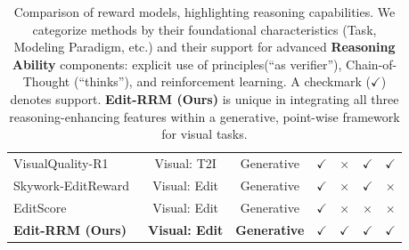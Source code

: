 \begin{table}[t]
{\begin{tabular}{l|c|c|c|ccc}
VisualQuality-R1~\citep{wu2025visualquality}         & Visual: T2I          &  Generative  & $\checkmark$ & $\times$     & $\checkmark$  & $\checkmark$     \\
Skywork-EditReward~\citep{wei2025skywork}      & Visual: Edit            &  Generative  & $\checkmark$ & $\times$     & $\checkmark$  & $\times$     \\
EditScore~\citep{luo2025editscore}         & Visual: Edit     & Generative  &$\checkmark$     & $\times$     & $\times$  & $\times$     \\
\textbf{Edit-RRM (Ours)}                      & \textbf{Visual: Edit   } &  \textbf{Generative} & $\checkmark$ & $\checkmark$ & $\checkmark$  & $\checkmark$    \\
\bottomrule
\end{tabular}%
}
\caption{Comparison of reward models, highlighting reasoning capabilities. We categorize methods by their foundational characteristics (Task, Modeling Paradigm, etc.) and their support for advanced \textbf{Reasoning Ability} components: explicit use of principles(``as verifier''), Chain-of-Thought (``thinks''), and reinforcement learning. A checkmark ($\checkmark$) denotes support. \textbf{Edit-RRM (Ours)} is unique in integrating all three reasoning-enhancing features within a generative, point-wise framework for visual tasks.}
\label{tab:main}
\end{table}